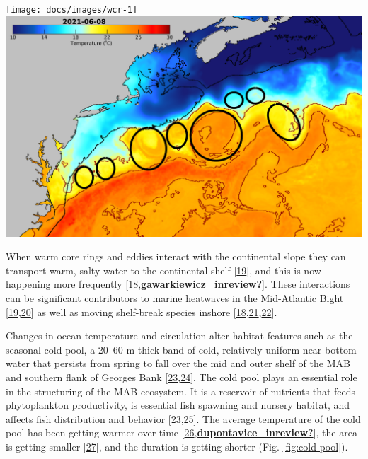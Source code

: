 \documentclass[
  10pt,
]{article}
\let\origfigure\figure
\let\endorigfigure\endfigure
\renewenvironment{figure}[1][2] {
    \expandafter\origfigure\expandafter[H]
} {
    \endorigfigure
}
\begin{document}
\begin{figure}

{\centering \texttt{[image: docs/images/wcr-1]} \includegraphics[width=0.49\linewidth]{images/D_20210608-MUR-SST-WCR} 

}

\caption{Warm core ring formation on the Northeast US Shelf: Annual number of rings (Left) and June 2021 rings (right).}\label{fig:wcr}
\end{figure}

When warm core rings and eddies interact with the continental slope they
can transport warm, salty water to the continental shelf
{[}\protect\hyperlink{ref-chen_mesoscale_2022}{19}{]}, and this is now
happening more frequently
{[}\protect\hyperlink{ref-gawarkiewicz_changing_2018}{18},\protect\hyperlink{ref-gawarkiewicz_inreview}{\textbf{gawarkiewicz\_inreview?}}{]}.
These interactions can be significant contributors to marine heatwaves
in the Mid-Atlantic Bight
{[}\protect\hyperlink{ref-chen_mesoscale_2022}{19},\protect\hyperlink{ref-gawarkiewicz_characteristics_2019}{20}{]}
as well as moving shelf-break species inshore
{[}\protect\hyperlink{ref-gawarkiewicz_changing_2018}{18},\protect\hyperlink{ref-potter_horizontal_2011}{21},\protect\hyperlink{ref-worm_predator_2003}{22}{]}.

Changes in ocean temperature and circulation alter habitat features such
as the seasonal cold pool, a 20--60 m thick band of cold, relatively
uniform near-bottom water that persists from spring to fall over the mid
and outer shelf of the MAB and southern flank of Georges Bank
{[}\protect\hyperlink{ref-lentz_seasonal_2017}{23},\protect\hyperlink{ref-chen_seasonal_2018}{24}{]}.
The cold pool plays an essential role in the structuring of the MAB
ecosystem. It is a reservoir of nutrients that feeds phytoplankton
productivity, is essential fish spawning and nursery habitat, and
affects fish distribution and behavior
{[}\protect\hyperlink{ref-lentz_seasonal_2017}{23},\protect\hyperlink{ref-miles_offshore_2021}{25}{]}.
The average temperature of the cold pool has been getting warmer over
time
{[}\protect\hyperlink{ref-miller_state-space_2016}{26},\protect\hyperlink{ref-dupontavice_inreview}{\textbf{dupontavice\_inreview?}}{]},
the area is getting smaller
{[}\protect\hyperlink{ref-friedland_middle_2022}{27}{]}, and the
duration is getting shorter (Fig. \ref{fig:cold-pool}).
\end{document}
